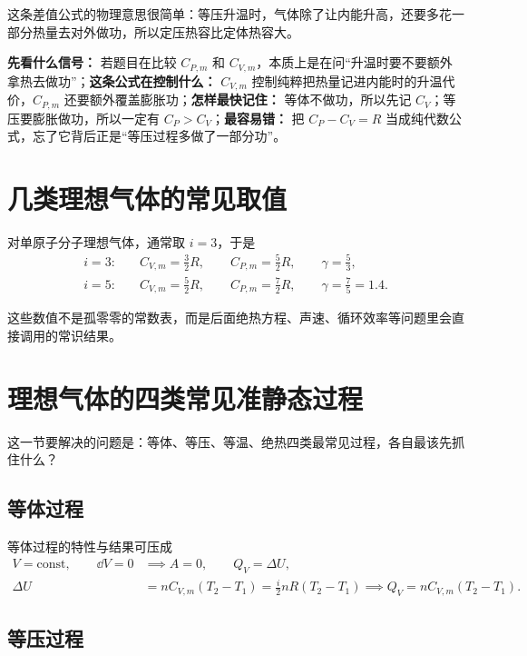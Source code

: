 \documentclass[lang=cn,11pt]{elegantbook}
\newcommand{\bridge}[1]{\begin{note}#1\end{note}}
\begin{document}
\bridge{这条差值公式的物理意思很简单：等压升温时，气体除了让内能升高，还要多花一部分热量去对外做功，所以定压热容比定体热容大。}

\begin{note}
\textbf{先看什么信号：} 若题目在比较 \(C_{P,m}\) 和 \(C_{V,m}\)，本质上是在问“升温时要不要额外拿热去做功”；\textbf{这条公式在控制什么：} \(C_{V,m}\) 控制纯粹把热量记进内能时的升温代价，\(C_{P,m}\) 还要额外覆盖膨胀功；\textbf{怎样最快记住：} 等体不做功，所以先记 \(C_V\)；等压要膨胀做功，所以一定有 \(C_P>C_V\)；\textbf{最容易错：} 把 \(C_P-C_V=R\) 当成纯代数公式，忘了它背后正是“等压过程多做了一部分功”。
\end{note}

\section{几类理想气体的常见取值}

对单原子分子理想气体，通常取 \(i=3\)，于是
\begin{align*}
i=3:\quad &C_{V,m}=\frac{3}{2}R,\qquad C_{P,m}=\frac{5}{2}R,\qquad \gamma=\frac{5}{3},\\
i=5:\quad &C_{V,m}=\frac{5}{2}R,\qquad C_{P,m}=\frac{7}{2}R,\qquad \gamma=\frac{7}{5}=1.4.
\end{align*}

\begin{remark}
这些数值不是孤零零的常数表，而是后面绝热方程、声速、循环效率等问题里会直接调用的常识结果。
\end{remark}

\section{理想气体的四类常见准静态过程}

这一节要解决的问题是：等体、等压、等温、绝热四类最常见过程，各自最该先抓住什么？

\subsection{等体过程}

等体过程的特性与结果可压成
\begin{align*}
V=\text{const},\qquad \dd V=0
&\implies A=0,\qquad Q_V=\Delta U,\\
\Delta U&=nC_{V,m}(T_2-T_1)=\frac{i}{2}nR(T_2-T_1)
\implies Q_V=nC_{V,m}(T_2-T_1).
\end{align*}

\subsection{等压过程}
\end{document}
